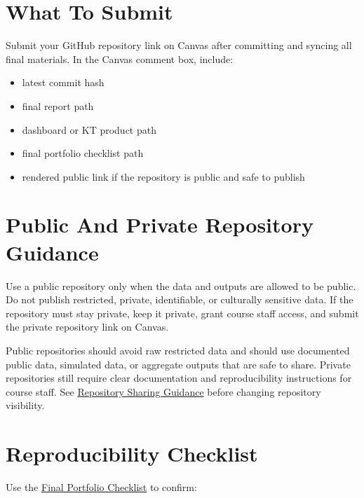 \documentclass[
  letterpaper,
  DIV=11,
  numbers=noendperiod,
  oneside]{scrreprt}
\providecommand{\tightlist}{%
  \setlength{\itemsep}{0pt}\setlength{\parskip}{0pt}}
\begin{document}
\section{What To Submit}\label{what-to-submit-6}

Submit your GitHub repository link on Canvas after committing and
syncing all final materials. In the Canvas comment box, include:

\begin{itemize}
\tightlist
\item
  latest commit hash
\item
  final report path
\item
  dashboard or KT product path
\item
  final portfolio checklist path
\item
  rendered public link if the repository is public and safe to publish
\end{itemize}

\section{Public And Private Repository
Guidance}\label{public-and-private-repository-guidance}

Use a public repository only when the data and outputs are allowed to be
public. Do not publish restricted, private, identifiable, or culturally
sensitive data. If the repository must stay private, keep it private,
grant course staff access, and submit the private repository link on
Canvas.

Public repositories should avoid raw restricted data and should use
documented public data, simulated data, or aggregate outputs that are
safe to share. Private repositories still require clear documentation
and reproducibility instructions for course staff. See
\href{repository-sharing-guidance.md}{Repository Sharing Guidance}
before changing repository visibility.

\section{Reproducibility Checklist}\label{reproducibility-checklist}

Use the \href{final-portfolio-checklist.md}{Final Portfolio Checklist}
to confirm:
\end{document}
